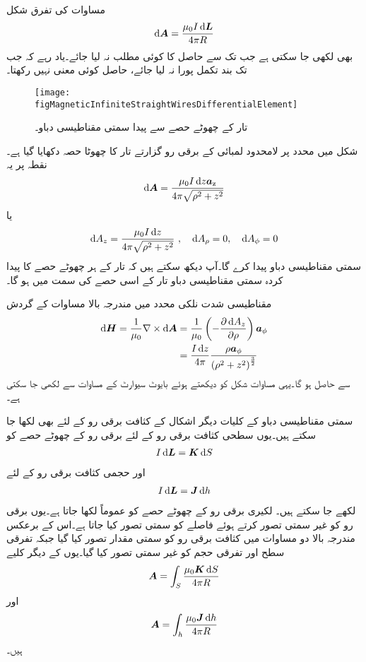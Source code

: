 مساوات  کی تفرق شکل
\begin{align}\label{مساوات_مقناطیسی_سمتی_دباو_تفرق_شکل}
\dif \kvec{A}=\frac{\mu_0 I \dif \kvec{L}}{4\pi R}
\end{align}
بھی لکھی جا سکتی ہے جب تک  سے حاصل  کا کوئی مطلب نہ لیا جائے۔یاد رہے کہ جب تک بند تکمل پورا نہ لیا جائے، حاصل  کوئی معنی نہیں رکھتا۔
\begin{figure}
\centering
\texttt{[image: figMagneticInfiniteStraightWiresDifferentialElement]}
\caption{تار کے چھوٹے حصے سے پیدا سمتی مقناطیسی دباو۔}
\label{شکل_مقناطیسی_سمتی_مقناطیسی_دباو_تفرق_حصہ}
\end{figure}

شکل  میں  محدد پر لامحدود لمبائی کے برقی رو گزارتے تار کا چھوٹا حصہ  دکھایا گیا ہے۔نقطہ  پر یہ
\begin{align*}
\dif \kvec{A}=\frac{\mu_0 I \dif z \az}{4\pi \sqrt{\rho^2+z^2}}
\end{align*}
یا
\begin{align}
\dif  A_z=\frac{\mu_0 I \dif z}{4\pi \sqrt{\rho^2+z^2}} \,\, , \quad \dif A_\rho=0, \quad \dif A_\phi=0
\end{align}
سمتی مقناطیسی دباو پیدا کرے گا۔آپ دیکھ سکتے ہیں کہ تار کے ہر چھوٹے حصے کا پیدا کردہ سمتی مقناطیسی دباو تار کے اسی حصے کی سمت میں ہو گا۔

مقناطیسی شدت  نلکی محدد میں مندرجہ بالا مساوات کے گردش
\begin{align*}
\dif \kvec{H}=\frac{1}{\mu_0} \nabla \times \dif \kvec{A}&=\frac{1}{\mu_0} \left(-\frac{\partial \dif A_z}{\partial \rho} \right)\aphi\\
&=\frac{I \dif z}{4\pi} \frac{\rho \aphi}{\left(\rho^2+z^2 \right)^{\frac{3}{2}}}
\end{align*}
 سے حاصل ہو گا۔یہی مساوات شکل  کو دیکھتے ہوئے بایوٹ سیوارٹ کے مساوات سے لکھی جا سکتی ہے۔

سمتی مقناطیسی دباو  کے کلیات دیگر اشکال کے کثافت برقی رو کے لئے بھی لکھا جا سکتے ہیں۔یوں سطحی کثافت برقی رو  کے لئے  برقی رو کے چھوٹے حصے کو
\begin{align*}
I \dif \kvec{L}=\kvec{K} \dif S
\end{align*}
اور حجمی کثافت برقی رو  کے لئے
\begin{align*}
I \dif \kvec{L}=\kvec{J} \dif h
\end{align*}
لکھے جا سکتے ہیں۔ لکیری برقی رو کے چھوٹے حصے کو عموماً  لکھا جاتا ہے۔یوں برقی رو کو غیر سمتی تصور کرتے ہوئے فاصلے کو سمتی تصور کیا جاتا ہے۔اس کے برعکس مندرجہ بالا دو مساوات میں کثافت برقی رو کو سمتی مقدار تصور کیا گیا جبکہ تفرقی سطح  اور تفرقی حجم  کو غیر سمتی تصور کیا گیا۔یوں  کے دیگر کلیے 
\begin{align}
\kvec{A}=\int_S \frac{\mu_0 \kvec{K} \dif S}{4\pi R}
\end{align}
اور
\begin{align}\label{مساوات_مقناطیسی_سمتی_مقناطیسی_دباو_حجمی_رو}
\kvec{A}=\int_h \frac{\mu_0 \kvec{J} \dif h}{4\pi R}
\end{align}
ہیں۔ 

